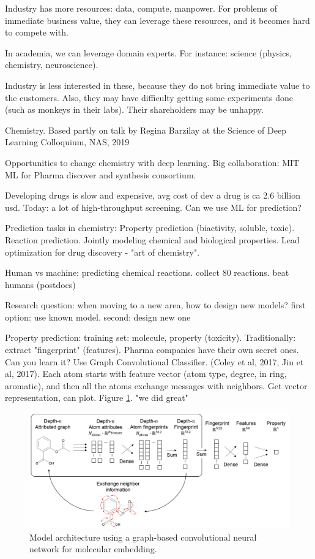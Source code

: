 \documentclass[english]{article}
\begin{document}
\benum 
\item Industry has more resources: data, compute, manpower. For problems of immediate business value, they can leverage these resources, and it becomes hard to compete with.
\item In academia, we can leverage domain experts. For instance: science (physics, chemistry, neuroscience). 

Industry is less interested in these, because they do not bring immediate value to the customers. Also, they may have difficulty getting some experiments done (such as monkeys in their labs). Their shareholders may be unhappy.

\item Chemistry. Based partly on talk by Regina Barzilay at the Science of Deep Learning Colloquium, NAS, 2019

Opportunities to change chemistry with deep learning. Big collaboration: MIT ML for Pharma discover and synthesis consortium.

Developing drugs is slow and expensive, avg cost of dev a drug is ca 2.6 billion usd. Today: a lot of high-throughput screening. Can we use ML for prediction?

Prediction tasks in chemistry: Property prediction (biactivity, soluble, toxic). Reaction prediction. Jointly modeling chemical and biological properties. Lead optimization for drug discovery - "art of chemistry".

Human vs machine:  predicting chemical reactions. collect 80 reactions. beat humans (postdocs)

Research question: when moving to a new area, how to design new models? first option: use known model. second: design new one

Property prediction: training set: molecule, property (toxicity). Traditionally: extract "fingerprint" (features). Pharma companies have their own secret ones. Can you learn it? Use Graph Convolutional Classifier. (Coley et al, 2017, Jin et al, 2017). Each atom starts with feature vector (atom type, degree, in ring, aromatic), and then all the atoms exchange messages with neighbors. Get vector representation, can plot. Figure \ref{gcnn_mol}. "we did great"  

\begin{figure}
  \centering
  \includegraphics[width=\textwidth]{gcnn_mol.png}
  \caption{Model architecture using a graph-based convolutional neural network for molecular embedding.}
  \label{gcnn_mol}
\end{figure}
\end{document}
